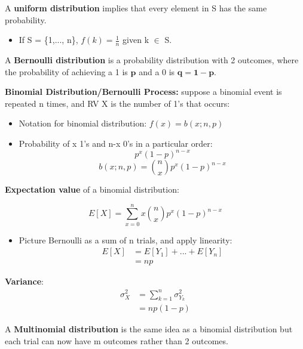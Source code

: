 \documentclass[10pt, letterpaper, twoside]{article}
\begin{document}
\begin{multicols}{2}
A \textbf{uniform distribution} implies that every element in S has the same probability.
\begin{itemize}
    \item If S = \{1,..., n\}, $f(k) = \frac{1}{n}$ given k $\in$ S.
\end{itemize}

A \textbf{Bernoulli distribution} is a probability distribution with 2 outcomes, where the probability of achieving a 1 is $\mathbf{p}$ and a 0 is $\mathbf{q = 1 - p}$.

\textbf{Binomial Distribution/Bernoulli Process:} suppose a binomial event is repeated n times, and RV X is the number of 1's that occurs:

\begin{itemize}
    \item Notation for binomial distribution: $f(x) = b(x;n,p)$
    \item Probability of x 1's and n-x 0's in a particular order:
    \begin{equation*}
        p^x(1-p)^{n-x}
    \end{equation*}
    \begin{equation*}
        b(x;n,p) = \binom{n}{x}p^x(1-p)^{n-x}
    \end{equation*}
\end{itemize}

\textbf{Expectation value} of a binomial distribution:

\begin{equation*}
    E[X] = \sum_{x=0}^nx\binom{n}{x}p^x(1-p)^{n-x}
\end{equation*}
\begin{itemize}
    \item Picture Bernoulli as a sum of n trials, and apply linearity:
    \begin{align*}
        E[X] &= E[Y_1] + ... + E[Y_n] \\
        &= np
    \end{align*}
\end{itemize}

\textbf{Variance}:
\begin{align*}
    \sigma_X^2 &= \sum_{k=1}^n\sigma_{Y_k}^2\\
    &= np(1-p)
\end{align*}

A \textbf{Multinomial distribution} is the same idea as a binomial distribution but each trial can now have m outcomes rather than 2 outcomes.


\end{multicols}
\end{document}
